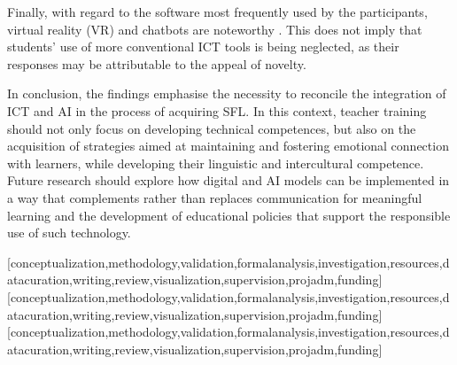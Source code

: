 \documentclass[english]{textolivre}
\begin{document}
Finally, with regard to the software most frequently used by the participants, virtual reality (VR) and chatbots are noteworthy \cite{guano2023, lucana2023, de-almeida-ferreira2024}. This does not imply that students' use of more conventional ICT tools is being neglected, as their responses may be attributable to the appeal of novelty.

In conclusion, the findings emphasise the necessity to reconcile the integration of ICT and AI in the process of acquiring SFL. In this context, teacher training should not only focus on developing technical competences, but also on the acquisition of strategies aimed at maintaining and fostering emotional connection with learners, while developing their linguistic and intercultural competence. Future research should explore how digital and AI models can be implemented in a way that complements rather than replaces communication for meaningful learning and the development of educational policies that support the responsible use of such technology.

\printbibliography\label{sec-bib}


\begin{contributors}
[conceptualization,methodology,validation,formalanalysis,investigation,resources,datacuration,writing,review,visualization,supervision,projadm,funding]
[conceptualization,methodology,validation,formalanalysis,investigation,resources,datacuration,writing,review,visualization,supervision,projadm,funding]
[conceptualization,methodology,validation,formalanalysis,investigation,resources,datacuration,writing,review,visualization,supervision,projadm,funding]
\end{contributors}
\end{document}
